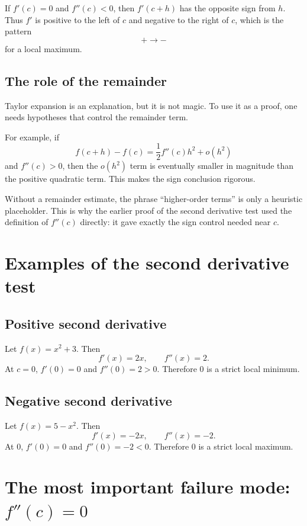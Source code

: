 \documentclass{essay}
\begin{document}
If \(f'(c)=0\) and \(f''(c)<0\), then \(f'(c+h)\) has the opposite sign from \(h\). Thus \(f'\) is positive to the left of \(c\) and negative to the right of \(c\), which is the pattern
\[
+\longrightarrow -
\]
for a local maximum.

\subsection{The role of the remainder}

Taylor expansion is an explanation, but it is not magic. To use it as a proof, one needs hypotheses that control the remainder term.

For example, if
\[
f(c+h)-f(c)
=
\frac12 f''(c)h^2
+
o(h^2)
\]
and \(f''(c)>0\), then the \(o(h^2)\) term is eventually smaller in magnitude than the positive quadratic term. This makes the sign conclusion rigorous.

Without a remainder estimate, the phrase ``higher-order terms'' is only a heuristic placeholder. This is why the earlier proof of the second derivative test used the definition of \(f''(c)\) directly: it gave exactly the sign control needed near \(c\).

\section{Examples of the second derivative test}

\subsection{Positive second derivative}

Let \(f(x)=x^2+3\).
Then
\[
f'(x)=2x,
\qquad
f''(x)=2.
\]
At \(c=0\), \(f'(0)=0\) and \(f''(0)=2>0\).
Therefore \(0\) is a strict local minimum.

\subsection{Negative second derivative}

Let \(f(x)=5-x^2\).
Then
\[
f'(x)=-2x,
\qquad
f''(x)=-2.
\]
At \(0\), \(f'(0)=0\) and \(f''(0)=-2<0\).
Therefore \(0\) is a strict local maximum.

\section{The most important failure mode: \texorpdfstring{\(f''(c)=0\)}{f''(c)=0}}
\end{document}
